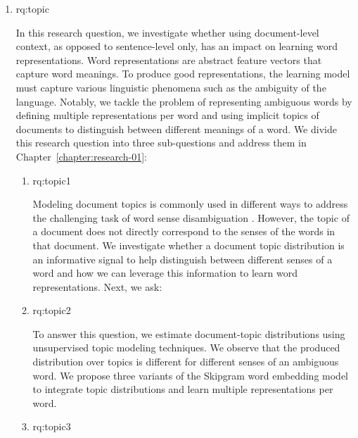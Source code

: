 \begin{enumerate}[label=\textbf{Research Question \arabic*:},ref={RQ\arabic*},wide = 0pt,resume]
\setlength\itemsep{1em}
\item \acl{rq:topic} \label{rq:topic}

In this research question, we investigate whether using document-level context, as opposed to sentence-level only, has an impact on learning word representations. Word representations are abstract feature vectors that capture word meanings. To produce good representations, the learning model must capture various linguistic phenomena such as the ambiguity of the language.  
Notably, we tackle the problem of representing ambiguous words by defining multiple representations per word and using implicit topics of documents to distinguish between different meanings of a word. 
We divide this research question into three sub-questions and address them in Chapter~\ref{chapter:research-01}:

\begin{enumerate}[label=\textbf{RQ1.\arabic*},wide = 0pt, leftmargin=2em]
\setlength\itemsep{1em}
\item \acl{rq:topic1}  \label{rq:topic1}

\medskip

Modeling document topics is commonly used in different ways to address the challenging task of word sense disambiguation \citep{boyd-graber-etal-2007-topic,li-etal-2010-topic,ChaplotS18}. 
However, the topic of a document does not directly correspond to the senses of the words in that document.
We investigate whether a document topic distribution is an informative signal to help distinguish between different senses of a word and how we can leverage this information to learn word representations. 
Next, we ask:

\item \acl{rq:topic2}  \label{rq:topic2}

\medskip

To answer this question, we estimate document-topic distributions using unsupervised topic modeling techniques. 
We observe that the produced distribution over topics is different for different senses of an ambiguous word. 
We propose three variants of the Skipgram word embedding model \citep{mikolov2013efficient} to integrate topic distributions and learn multiple representations per word. 

\item \acl{rq:topic3}  \label{rq:topic3}


\end{enumerate}
\end{enumerate}
